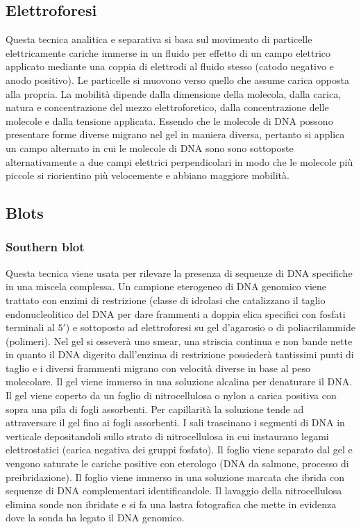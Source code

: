 \subsection{Elettroforesi}
Questa tecnica analitica e separativa si basa sul movimento di particelle elettricamente cariche immerse in un fluido per effetto di un campo elettrico applicato mediante una
coppia di elettrodi al fluido stesso (catodo negativo e anodo positivo). Le particelle si muovono verso quello che assume carica opposta alla propria. La mobilit\`a dipende dalla 
dimensione della molecola, dalla carica, natura e concentrazione del mezzo elettroforetico, dalla concentrazione delle molecole  e dalla tensione applicata. Essendo che le molecole di
DNA possono presentare forme diverse migrano nel gel in maniera diversa, pertanto si applica un campo alternato in cui le molecole di DNA sono sono sottoposte alternativamente a due 
campi elettrici perpendicolari in modo che le molecole pi\`u piccole si riorientino pi\`u velocemente e abbiano maggiore mobilit\`a. 
\subsection{Blots}
\subsubsection{Southern blot}
Questa tecnica viene usata per rilevare la presenza di sequenze di DNA specifiche in una miscela complessa. Un campione eterogeneo di DNA genomico viene trattato con enzimi di 
restrizione (classe di idrolasi che catalizzano il taglio endonucleolitico del DNA per dare frammenti a doppia elica specifici con fosfati terminali al $5'$) e sottoposto ad 
elettroforesi su gel d'agarosio o di poliacrilammide (polimeri). Nel gel si ossever\`a uno smear, una striscia continua e non bande nette in quanto il DNA digerito dall'enzima di 
restrizione possieder\`a tantissimi punti di taglio e i diversi frammenti migrano con velocit\`a diverse in base al peso molecolare. Il gel viene immerso in una soluzione alcalina per
denaturare il DNA. Il gel viene coperto da un foglio di nitrocellulosa o nylon a carica positiva con sopra una pila di fogli assorbenti. Per capillarit\`a la soluzione tende ad 
attraversare il gel fino ai fogli assorbenti. I sali trascinano i segmenti di DNA in verticale depositandoli sullo strato di nitrocellulosa in cui instaurano legami elettrostatici 
(carica negativa dei gruppi fosfato). Il foglio viene separato dal gel e vengono saturate le cariche positive con eterologo (DNA da salmone, processo di preibridazione). Il foglio viene
immerso in una soluzione marcata che ibrida con sequenze di DNA complementari identificandole. Il lavaggio della nitrocellulosa elimina sonde non ibridate e si fa una lastra 
fotografica che mette in evidenza dove la sonda ha legato il DNA genomico. 
